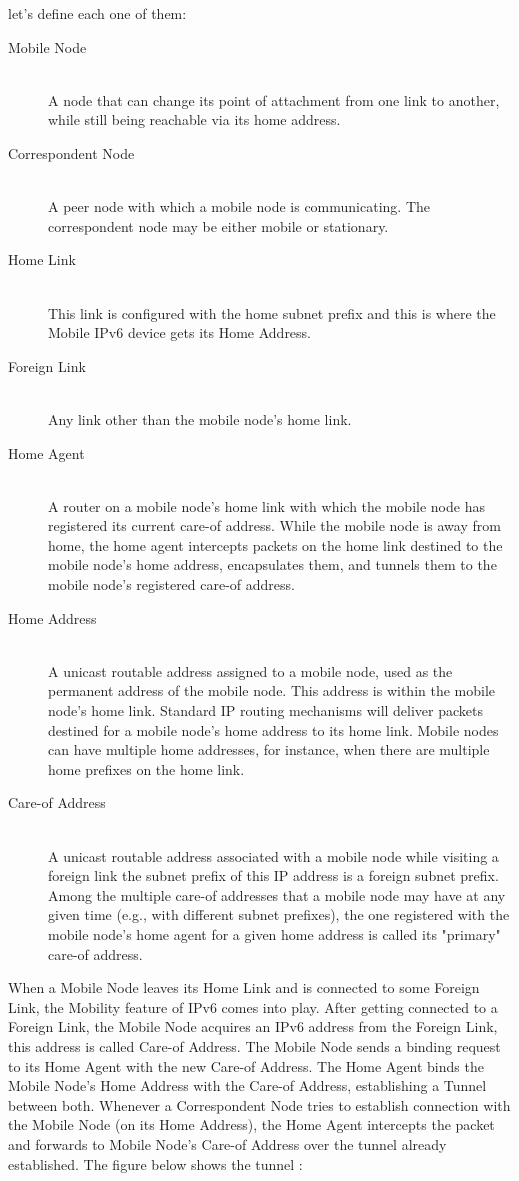 \documentclass{article}
\begin{document}
let's define each one of them:
\begin{description}
  \item[Mobile Node] \hfill \\ 
A node that can change its point of attachment from one link to
another, while still being reachable via its home address.
  \item[Correspondent Node] \hfill \\
A peer node with which a mobile node is communicating.  The
correspondent node may be either mobile or stationary.
  \item[Home Link] \hfill \\ 
This link is configured with the home subnet prefix and this is where
the Mobile IPv6 device gets its Home Address.
  \item[Foreign Link] \hfill \\
Any link other than the mobile node's home link.
  \item[Home Agent] \hfill \\ 
A router on a mobile node's home link with which the mobile node has
registered its current care-of address.  While the mobile node is away
from home, the home agent intercepts packets on the home link destined
to the mobile node's home address, encapsulates them, and tunnels them
to the mobile node's registered care-of address.
  \item[Home Address] \hfill \\ 
A unicast routable address assigned to a mobile node, used as the
permanent address of the mobile node.  This address is within the
mobile node's home link.  Standard IP routing mechanisms will deliver
packets destined for a mobile node's home address to its home link.
Mobile nodes can have multiple home addresses, for instance, when
there are multiple home prefixes on the home link.
  \item[Care-of Address] \hfill \\
A unicast routable address associated with a mobile node while
visiting a foreign link the subnet prefix of this IP address is a
foreign subnet prefix.  Among the multiple care-of addresses that a
mobile node may have at any given time (e.g., with different subnet
prefixes), the one registered with the mobile node's home agent for a
given home address is called its "primary" care-of address.

\end{description}


When a Mobile Node leaves its Home Link and is connected to some
Foreign Link, the Mobility feature of IPv6 comes into play. After
getting connected to a Foreign Link, the Mobile Node acquires an IPv6
address from the Foreign Link, this address is called Care-of
Address. The Mobile Node sends a binding request to its Home Agent
with the new Care-of Address. The Home Agent binds the Mobile Node’s
Home Address with the Care-of Address, establishing a Tunnel between
both. Whenever a Correspondent Node tries to establish connection with
the Mobile Node (on its Home Address), the Home Agent intercepts the
packet and forwards to Mobile Node’s Care-of Address over the tunnel
already established. The figure below shows the tunnel :
\end{document}
